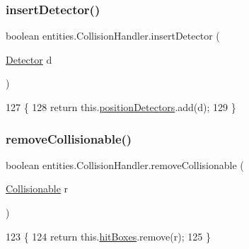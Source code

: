 \subsubsection{\texorpdfstring{insert\+Detector()}{insertDetector()}}
{\footnotesize\ttfamily boolean entities.\+Collision\+Handler.\+insert\+Detector (\begin{DoxyParamCaption}\item[{\mbox{\hyperlink{interfacedetectors_1_1_detector}{Detector}}}]{d }\end{DoxyParamCaption})\hspace{0.3cm}{\ttfamily [inline]}}


\begin{DoxyCode}
127                                               \{
128         \textcolor{keywordflow}{return} this.\mbox{\hyperlink{classentities_1_1_collision_handler_ac8a71d4c1785179065bb3461aae87a1f}{positionDetectors}}.add(d);
129     \}
\end{DoxyCode}
\mbox{\label{classentities_1_1_collision_handler_a0634abfade22196f7c8292dca6d4c883}} 
\subsubsection{\texorpdfstring{remove\+Collisionable()}{removeCollisionable()}}
{\footnotesize\ttfamily boolean entities.\+Collision\+Handler.\+remove\+Collisionable (\begin{DoxyParamCaption}\item[{\mbox{\hyperlink{interfaceentities_1_1_collisionable}{Collisionable}}}]{r }\end{DoxyParamCaption})\hspace{0.3cm}{\ttfamily [inline]}}


\begin{DoxyCode}
123                                                         \{
124         \textcolor{keywordflow}{return} this.\mbox{\hyperlink{classentities_1_1_collision_handler_a4a3eab5e53bb34f16026644c4d7c0595}{hitBoxes}}.remove(r);
125     \}
\end{DoxyCode}
\mbox{\label{classentities_1_1_collision_handler_ac5666badd0093fd9c960c1a7a22ce65e}} 
